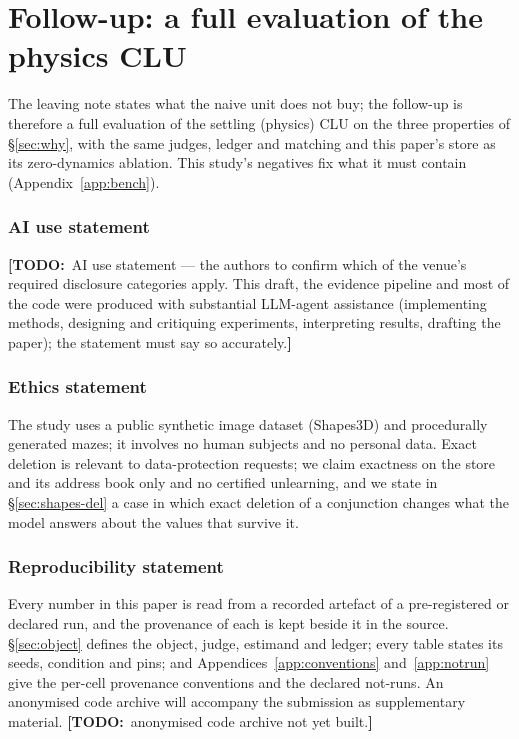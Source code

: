\documentclass{article} %
\newcommand{\TODO}[1]{{\color{orange}\textbf{[TODO:}~#1\textbf{]}}}
\begin{document}
\section{Follow-up: a full evaluation of the physics CLU}
\label{sec:followup}

The leaving note states what the naive unit does not buy; the follow-up is therefore a full evaluation of the settling (physics) CLU on the three properties of \S\ref{sec:why}, with the same judges, ledger and matching and this paper's store as its zero-dynamics ablation. This study's negatives fix what it must contain (Appendix~\ref{app:bench}).

\subsubsection*{AI use statement}
\TODO{AI use statement --- the authors to confirm which of the venue's required disclosure categories
apply. This draft, the evidence pipeline and most of the code were produced with substantial LLM-agent
assistance (implementing methods, designing and critiquing experiments, interpreting results,
drafting the paper); the statement must say so accurately.}

\subsubsection*{Ethics statement}
The study uses a public synthetic image dataset (Shapes3D) and procedurally generated mazes; it
involves no human subjects and no personal data. Exact deletion is relevant to data-protection
requests; we claim exactness on the store and its address book only and no certified unlearning, and
we state in \S\ref{sec:shapes-del} a case in which exact deletion of a conjunction changes what the
model answers about the values that survive it.

\subsubsection*{Reproducibility statement}
Every number in this paper is read from a recorded artefact of a pre-registered or declared run,
and the provenance of each is kept beside it in the source. \S\ref{sec:object} defines the
object, judge, estimand and ledger; every table states its seeds, condition and pins; and
Appendices~\ref{app:conventions} and~\ref{app:notrun} give the per-cell provenance conventions and
the declared not-runs. An anonymised code archive will accompany the submission as
supplementary material. \TODO{anonymised code archive not yet built.}
\end{document}

